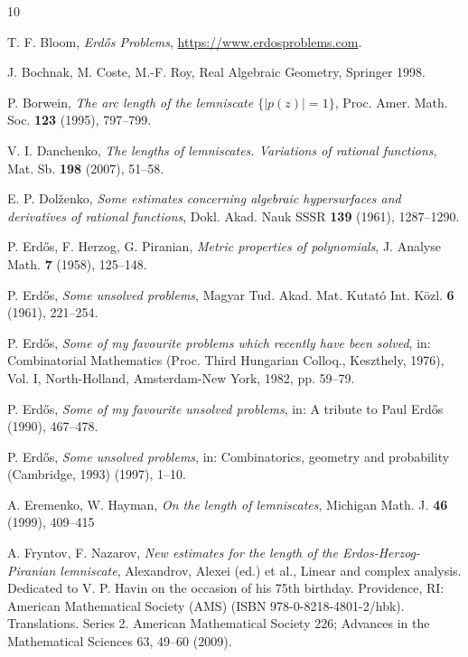 \documentclass[12pt]{amsart}
\begin{document}
\begin{thebibliography}{10}

T. F. Bloom, \emph{Erd\H{o}s Problems}, \url{https://www.erdosproblems.com}.

J. Bochnak, M. Coste, M.-F. Roy, Real Algebraic Geometry, Springer 1998.

P. Borwein, \emph{The arc length of the lemniscate $\{|p(z)|=1\}$}, Proc. Amer. Math. Soc. \textbf{123} (1995), 797--799.


V. I. Danchenko, \emph{The lengths of lemniscates. Variations of rational functions}, Mat. Sb. \textbf{198} (2007), 51--58.

E. P. Dol\v zenko, \emph{Some estimates concerning algebraic hypersurfaces and derivatives of rational functions}, Dokl. Akad. Nauk SSSR \textbf{139} (1961), 1287--1290.

P. Erd\H{o}s, F. Herzog, G. Piranian, \emph{Metric properties of polynomials}, J. Analyse Math. \textbf{7} (1958), 125--148.


P. Erd\H{o}s, \emph{Some unsolved problems}, Magyar Tud. Akad. Mat. Kutató Int. Közl. \textbf{6} (1961), 221--254.

P. Erd\H{o}s, \emph{Some of my favourite problems which recently have been solved}, in: Combinatorial Mathematics (Proc. Third Hungarian Colloq., Keszthely, 1976), Vol. I, North-Holland, Amsterdam-New York, 1982, pp. 59--79.

P. Erd\H{o}s, \emph{Some of my favourite unsolved problems}, in: A tribute to Paul Erdős (1990), 467--478.

P. Erd\H{o}s, \emph{Some unsolved problems}, in: Combinatorics, geometry and probability (Cambridge, 1993) (1997), 1--10.

A. Eremenko, W. Hayman, \emph{On the length of lemniscates}, Michigan Math. J. \textbf{46} (1999), 409--415

A. Fryntov, F. Nazarov, \emph{New estimates for the length of the Erdos-Herzog-Piranian lemniscate}, Alexandrov, Alexei (ed.) et al., Linear and complex analysis. Dedicated to V. P. Havin on the occasion of his 75th birthday. Providence, RI: American Mathematical Society (AMS) (ISBN 978-0-8218-4801-2/hbk). Translations. Series 2. American Mathematical Society 226; Advances in the Mathematical Sciences 63, 49--60 (2009).


\end{thebibliography}
\end{document}
